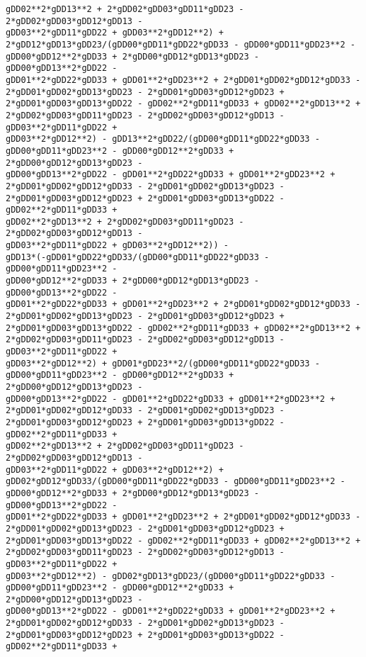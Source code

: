 \documentclass[landscape,letterpaper,10pt,english]{article}
\begin{document}
\begin{Verbatim}[commandchars=\\\{\}]
gDD02**2*gDD13**2 + 2*gDD02*gDD03*gDD11*gDD23 - 2*gDD02*gDD03*gDD12*gDD13 -
gDD03**2*gDD11*gDD22 + gDD03**2*gDD12**2) +
2*gDD12*gDD13*gDD23/(gDD00*gDD11*gDD22*gDD33 - gDD00*gDD11*gDD23**2 -
gDD00*gDD12**2*gDD33 + 2*gDD00*gDD12*gDD13*gDD23 - gDD00*gDD13**2*gDD22 -
gDD01**2*gDD22*gDD33 + gDD01**2*gDD23**2 + 2*gDD01*gDD02*gDD12*gDD33 -
2*gDD01*gDD02*gDD13*gDD23 - 2*gDD01*gDD03*gDD12*gDD23 +
2*gDD01*gDD03*gDD13*gDD22 - gDD02**2*gDD11*gDD33 + gDD02**2*gDD13**2 +
2*gDD02*gDD03*gDD11*gDD23 - 2*gDD02*gDD03*gDD12*gDD13 - gDD03**2*gDD11*gDD22 +
gDD03**2*gDD12**2) - gDD13**2*gDD22/(gDD00*gDD11*gDD22*gDD33 -
gDD00*gDD11*gDD23**2 - gDD00*gDD12**2*gDD33 + 2*gDD00*gDD12*gDD13*gDD23 -
gDD00*gDD13**2*gDD22 - gDD01**2*gDD22*gDD33 + gDD01**2*gDD23**2 +
2*gDD01*gDD02*gDD12*gDD33 - 2*gDD01*gDD02*gDD13*gDD23 -
2*gDD01*gDD03*gDD12*gDD23 + 2*gDD01*gDD03*gDD13*gDD22 - gDD02**2*gDD11*gDD33 +
gDD02**2*gDD13**2 + 2*gDD02*gDD03*gDD11*gDD23 - 2*gDD02*gDD03*gDD12*gDD13 -
gDD03**2*gDD11*gDD22 + gDD03**2*gDD12**2)) -
gDD13*(-gDD01*gDD22*gDD33/(gDD00*gDD11*gDD22*gDD33 - gDD00*gDD11*gDD23**2 -
gDD00*gDD12**2*gDD33 + 2*gDD00*gDD12*gDD13*gDD23 - gDD00*gDD13**2*gDD22 -
gDD01**2*gDD22*gDD33 + gDD01**2*gDD23**2 + 2*gDD01*gDD02*gDD12*gDD33 -
2*gDD01*gDD02*gDD13*gDD23 - 2*gDD01*gDD03*gDD12*gDD23 +
2*gDD01*gDD03*gDD13*gDD22 - gDD02**2*gDD11*gDD33 + gDD02**2*gDD13**2 +
2*gDD02*gDD03*gDD11*gDD23 - 2*gDD02*gDD03*gDD12*gDD13 - gDD03**2*gDD11*gDD22 +
gDD03**2*gDD12**2) + gDD01*gDD23**2/(gDD00*gDD11*gDD22*gDD33 -
gDD00*gDD11*gDD23**2 - gDD00*gDD12**2*gDD33 + 2*gDD00*gDD12*gDD13*gDD23 -
gDD00*gDD13**2*gDD22 - gDD01**2*gDD22*gDD33 + gDD01**2*gDD23**2 +
2*gDD01*gDD02*gDD12*gDD33 - 2*gDD01*gDD02*gDD13*gDD23 -
2*gDD01*gDD03*gDD12*gDD23 + 2*gDD01*gDD03*gDD13*gDD22 - gDD02**2*gDD11*gDD33 +
gDD02**2*gDD13**2 + 2*gDD02*gDD03*gDD11*gDD23 - 2*gDD02*gDD03*gDD12*gDD13 -
gDD03**2*gDD11*gDD22 + gDD03**2*gDD12**2) +
gDD02*gDD12*gDD33/(gDD00*gDD11*gDD22*gDD33 - gDD00*gDD11*gDD23**2 -
gDD00*gDD12**2*gDD33 + 2*gDD00*gDD12*gDD13*gDD23 - gDD00*gDD13**2*gDD22 -
gDD01**2*gDD22*gDD33 + gDD01**2*gDD23**2 + 2*gDD01*gDD02*gDD12*gDD33 -
2*gDD01*gDD02*gDD13*gDD23 - 2*gDD01*gDD03*gDD12*gDD23 +
2*gDD01*gDD03*gDD13*gDD22 - gDD02**2*gDD11*gDD33 + gDD02**2*gDD13**2 +
2*gDD02*gDD03*gDD11*gDD23 - 2*gDD02*gDD03*gDD12*gDD13 - gDD03**2*gDD11*gDD22 +
gDD03**2*gDD12**2) - gDD02*gDD13*gDD23/(gDD00*gDD11*gDD22*gDD33 -
gDD00*gDD11*gDD23**2 - gDD00*gDD12**2*gDD33 + 2*gDD00*gDD12*gDD13*gDD23 -
gDD00*gDD13**2*gDD22 - gDD01**2*gDD22*gDD33 + gDD01**2*gDD23**2 +
2*gDD01*gDD02*gDD12*gDD33 - 2*gDD01*gDD02*gDD13*gDD23 -
2*gDD01*gDD03*gDD12*gDD23 + 2*gDD01*gDD03*gDD13*gDD22 - gDD02**2*gDD11*gDD33 +

\end{Verbatim}
\end{document}
